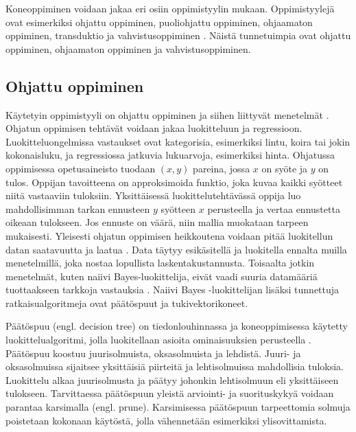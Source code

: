 \documentclass[utf8]{gradu3}
\begin{document}
Koneoppiminen voidaan jakaa eri osiin oppimistyylin mukaan. Oppimistyylejä ovat esimerkiksi ohjattu oppiminen, puoliohjattu oppiminen, ohjaamaton oppiminen, transduktio ja vahvistusoppiminen \parencite{das2017survey}. Näistä tunnetuimpia ovat ohjattu oppiminen, ohjaamaton oppiminen ja vahvistusoppiminen.

\subsection{Ohjattu oppiminen}

Käytetyin oppimistyyli on ohjattu oppiminen ja siihen liittyvät menetelmät \parencite{jordan2015machine,nasteski2017overview}. Ohjatun oppimisen tehtävät voidaan jakaa luokitteluun ja regressioon. Luokitteluongelmissa vastaukset ovat kategorisia, esimerkiksi lintu, koira tai jokin kokonaisluku, ja regressiossa jatkuvia lukuarvoja, esimerkiksi hinta. Ohjatussa oppimisessa opetusaineisto tuodaan \((x,y)\) pareina, jossa \(x\) on syöte ja \(y\) on tulos. Oppijan tavoitteena on approksimoida funktio, joka kuvaa kaikki syötteet niitä vastaaviin tuloksiin. Yksittäisessä luokittelutehtävässä oppija luo mahdollisimman tarkan ennusteen \(y\) syötteen \(x\) perusteella ja vertaa ennustetta oikeaan tulokseen. Jos ennuste on väärä, niin mallia muokataan tarpeen mukaisesti. Yleisesti ohjatun oppimisen heikkoutena voidaan pitää luokitellun datan saatavuutta ja laatua \parencite{das2017survey}. Data täytyy esikäsitellä ja luokitella ennalta muilla menetelmillä, joka nostaa lopullista laskentakustannusta. Toisaalta jotkin menetelmät, kuten naiivi Bayes-luokittelija, eivät vaadi suuria datamääriä tuottaakseen tarkkoja vastauksia \parencite{osisanwo2017supervised}. Naiivi Bayes -luokittelijan lisäksi tunnettuja ratkaisualgoritmeja ovat päätöspuut ja tukivektorikoneet.

Päätöspuu (engl. decision tree) on tiedonlouhinnassa ja koneoppimisessa käytetty luokittelualgoritmi, jolla luokitellaan asioita ominaisuuksien perusteella \parencite{nasteski2017overview,osisanwo2017supervised}. Päätöspuu koostuu juurisolmuista, oksasolmuista ja lehdistä. Juuri- ja oksasolmuissa sijaitsee yksittäisiä piirteitä ja lehtisolmuissa mahdollisia tuloksia. Luokittelu alkaa juurisolmusta ja päätyy johonkin lehtisolmuun eli yksittäiseen tulokseen. Tarvittaessa päätöspuun yleistä arviointi- ja suorituskykyä voidaan parantaa karsimalla (engl. prune). Karsimisessa päätöspuun tarpeettomia solmuja poistetaan kokonaan käytöstä, jolla vähennetään esimerkiksi ylisovittamista.
\end{document}
